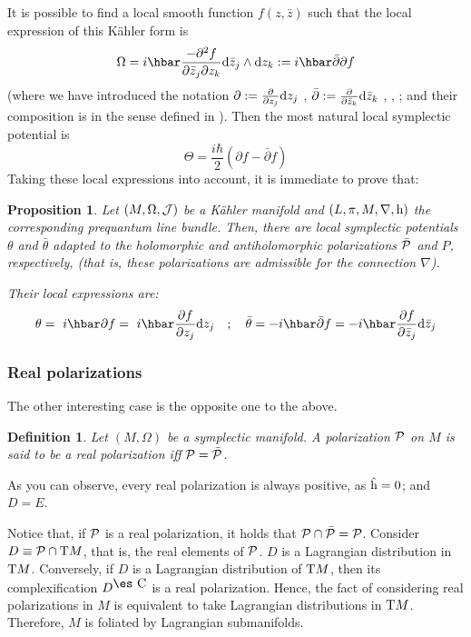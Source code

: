\documentclass[12pt]{article}
\theoremstyle{plain}
\newtheorem{prop}{Proposition}
\newtheorem{definition}{Definition}
\def\dst{\(}
\def\derpar#1#2{\frac{\partial{#1}}{\partial{#2}}}
\def\d{{\rm d}}
\def\P{{\cal P}}
\def\h{{\rm h}}
\def\Complex{\mbox{\es C}}
\def\Tan{{\rm T}}
\begin{document}
It is possible to find a local smooth function $f(z,\bar z)$
such that the local expression of this K\"ahler form is
$$
\Omega=i \hbar\frac{-\partial^2 f}{\partial \bar z_j \partial z_k}
\d \bar z_j \wedge \d z_k
:= i \hbar \bar \partial \partial f
$$
(where we have introduced the notation
\dst\partial := \derpar{}{z_j}\d z_j\) ,
\dst\bar \partial := \derpar{}{\bar z_k}\d \bar z_k\)
\cite{KN-69}, \cite{MK-71}, \cite{Ok-87};
and their composition is in the sense defined in \cite{Wl-85}).
Then the most natural local symplectic potential is
$$
\Theta = \frac{i\hbar}{2}(\partial f -\bar \partial f)
$$
Taking these local expressions into account,
it is immediate to prove that:

\begin{prop}
Let $(M,\Omega ,{\cal J})$ be a K\"ahler manifold
and $(L,\pi,M,\nabla ,\h )$ the corresponding prequantum line bundle.
Then, there are local symplectic potentials
$\theta$ and $\bar \theta$ adapted to the
holomorphic and antiholomorphic polarizations
$\bar \P$ and $P$, respectively,
(that is, these polarizations are admissible
for the connection $\nabla$).

Their local expressions are:
 $$
 \theta =\ i\hbar \partial f =\ i\hbar\derpar{f}{z_j}\d z_j
 \quad ; \quad
 \bar \theta = -i\hbar \bar \partial f=
 -i\hbar\derpar{f}{\bar z_j}\d \bar z_j
 $$
\label{asp}
\end{prop}



\subsubsection{Real polarizations}


The other interesting case is the opposite one
to the above.

\begin{definition}
Let $(M,\Omega )$ be a symplectic manifold.
A polarization $\P$ on $M$ is said to be a
{\rm real polarization} iff
$\P = \bar \P$.
\end{definition}

As you can observe, every real polarization
is always positive, as $\hat\h=0$; and $D=E$.

Notice that, if ${\cal P}$ is a real polarization,
it holds that
${\cal P}\cap \bar{\cal P} = {\cal P}$.
Consider $D \equiv {\cal P} \cap \Tan M$,
that is, the real elements of ${\cal P}$.
$D$ is a Lagrangian distribution in $\Tan M$.
Conversely, if $D$ is a Lagrangian distribution of $\Tan M$,
then its complexification $D^{\Complex}$
is a real polarization.
Hence, the fact of considering real polarizations in $M$
is equivalent to take Lagrangian distributions in $\Tan M$.
Therefore, $M$ is foliated by Lagrangian submanifolds.
\end{document}
